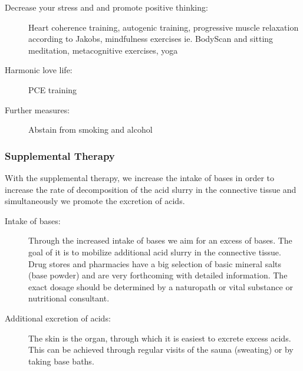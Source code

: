 \documentclass[../main.tex]{subfiles}
\begin{document}
\begin{description}
  \item[Decrease your stress and and promote positive thinking:] Heart coherence training, autogenic training, progressive muscle relaxation according to Jakobs,
    mindfulness exercises ie. BodyScan and sitting meditation, metacognitive exercises, yoga
  \item[Harmonic love life:] PCE training
   \item[Further measures:] Abstain from smoking and alcohol 
  \end{description}

  \subsubsection{Supplemental Therapy}

  With the supplemental therapy, we increase the intake of bases in order to increase the rate of decomposition of the acid slurry in the connective tissue
  and simultaneously we promote the excretion of acids.

  \begin{description}
  \item[Intake of bases:] Through the increased intake of bases we aim for an excess of bases.
    The goal of it is to mobilize additional acid slurry in the connective tissue.
    Drug stores and pharmacies have a big selection of basic mineral salts (base powder) and are very forthcoming with detailed information.
    The exact dosage should be determined by a naturopath or vital substance or nutritional consultant.
  \item[Additional excretion of acids:] The skin is the organ, through which it is easiest to excrete excess acids.
    This can be achieved through regular visits of the sauna (sweating) or by taking base baths.
  \end{description}
  
\end{document}
